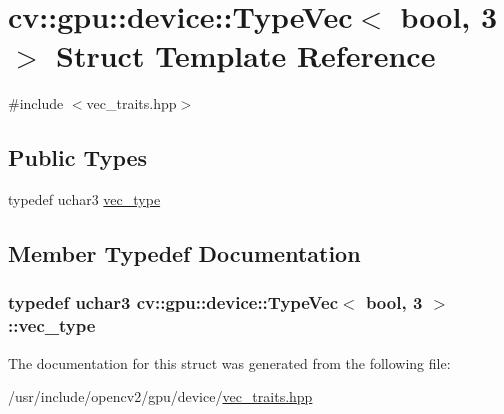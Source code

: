 \hypertarget{structcv_1_1gpu_1_1device_1_1TypeVec_3_01bool_00_013_01_4}{\section{cv\-:\-:gpu\-:\-:device\-:\-:Type\-Vec$<$ bool, 3 $>$ Struct Template Reference}
\label{structcv_1_1gpu_1_1device_1_1TypeVec_3_01bool_00_013_01_4}
}


{\ttfamily \#include $<$vec\-\_\-traits.\-hpp$>$}

\subsection*{Public Types}
\begin{DoxyCompactItemize}
\item 
typedef uchar3 \hyperlink{structcv_1_1gpu_1_1device_1_1TypeVec_3_01bool_00_013_01_4_a47797a044c4a728cdc0707b0da08c778}{vec\-\_\-type}
\end{DoxyCompactItemize}


\subsection{Member Typedef Documentation}
\hypertarget{structcv_1_1gpu_1_1device_1_1TypeVec_3_01bool_00_013_01_4_a47797a044c4a728cdc0707b0da08c778}{
\subsubsection[{vec\-\_\-type}]{\setlength{\rightskip}{0pt plus 5cm}typedef uchar3 {\bf cv\-::gpu\-::device\-::\-Type\-Vec}$<$ bool, 3 $>$\-::{\bf vec\-\_\-type}}}\label{structcv_1_1gpu_1_1device_1_1TypeVec_3_01bool_00_013_01_4_a47797a044c4a728cdc0707b0da08c778}


The documentation for this struct was generated from the following file\-:\begin{DoxyCompactItemize}
\item 
/usr/include/opencv2/gpu/device/\hyperlink{vec__traits_8hpp}{vec\-\_\-traits.\-hpp}\end{DoxyCompactItemize}
